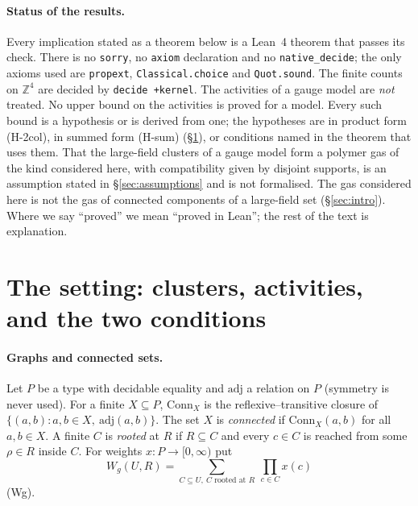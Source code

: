 \documentclass[11pt,a4paper]{article}
\theoremstyle{definition}
\theoremstyle{remark}
\DeclareRobustCommand{\lean}[1]{{\ttfamily\renewcommand{\_}{\textunderscore\allowbreak}#1}}
\newcommand{\Z}{\mathbb{Z}}
\begin{document}
\paragraph{Status of the results.} Every implication stated as a theorem below is a Lean~4 theorem that passes its check. There is no \texttt{sorry}, no \texttt{axiom} declaration and no \texttt{native\_decide}; the only axioms used are \texttt{propext}, \texttt{Classical.choice} and \texttt{Quot.sound}. The finite counts on $\Z^4$ are decided by \texttt{decide +kernel}. The activities of a gauge model are \emph{not} treated. No upper bound on the activities is proved for a model. Every such bound is a hypothesis or is derived from one; the hypotheses are in product form (H-2col), in summed form (H-sum) (\S\ref{sec:setting}), or conditions named in the theorem that uses them. That the large-field clusters of a gauge model form a polymer gas of the kind considered here, with compatibility given by disjoint supports, is an assumption stated in \S\ref{sec:assumptions} and is not formalised. The gas considered here is not the gas of connected components of a large-field set (\S\ref{sec:intro}). Where we say ``proved'' we mean ``proved in Lean''; the rest of the text is explanation.

\section{The setting: clusters, activities, and the two conditions}\label{sec:setting}

\paragraph{Graphs and connected sets.} Let $P$ be a type with decidable equality and $\mathrm{adj}$ a relation on $P$ (symmetry is never used). For a finite $X\subseteq P$, $\mathrm{Conn}_X$ is the reflexive--transitive closure of $\{(a,b):a,b\in X,\ \mathrm{adj}(a,b)\}$. The set $X$ is \emph{connected} if $\mathrm{Conn}_X(a,b)$ for all $a,b\in X$. A finite $C$ is \emph{rooted} at $R$ if $R\subseteq C$ and every $c\in C$ is reached from some $\rho\in R$ inside $C$. For weights $x:P\to[0,\infty)$ put
\[
W_g(U,R)=\sum_{C\subseteq U,\ C\text{ rooted at }R}\ \prod_{c\in C}x(c)
\]
(\lean{Wg}).
\end{document}
